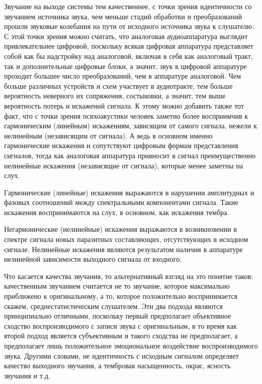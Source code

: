 \documentclass[oneside, final, 14pt]{extreport}
\begin{document}
Звучание на выходе системы тем качественнее, с точки зрения идентичности со звучанием источника звука, чем
меньше стадий обработки и преобразований прошли звуковые колебания на пути от исходного источника звука к слушателю. С этой точки зрения можно считать, что аналоговая аудиоаппаратура выглядит привлекательнее цифровой, поскольку всякая цифровая аппаратура представляет собой как бы надстройку над аналоговой, включая в себя как аналоговый тракт, так и дополнительные цифровые блоки, а значит, звук в цифровой аппаратуре проходит большее число преобразований, чем в аппаратуре аналоговой. Чем больше различных устройств и схем участвует в аудиотракте, тем больше вероятность неверного их сопряжения, состыковки, а значит, тем выше вероятность потерь и искажений сигнала. К этому можно добавить также тот факт, что с точки зрения психоакустики человек заметно более восприимчив к гармоническим (линейным) искажениям, зависящим от самого сигнала, нежели к нелинейным (независящим от сигнала). 
А ведь в основном именно гармонические искажения и сопутствуют цифровым формам представления сигналов, тогда как аналоговая аппаратура привносит в сигнал преимущественно нелинейные искажения (независящие от сигнала), которые менее заметны на слух.

Гармонические (линейные) искажения выражаются в нарушении амплитудных и фазовых соотношений между спектральными компонентами сигнала. Такие искажения воспринимаются на слух, в основном, как искажения тембра.

Негармонические (нелинейные) искажения выражаются в возникновении в спектре сигнала новых паразитных составляющих, отсутствующих в исходном сигнале. Нелинейные искажения являются результатом наличия в аппаратуре нелинейной зависимости выходного сигнала от входного.

Что касается качества звучания, то альтернативный взгляд на это понятие таков: качественным звучанием считается не то звучание, которое максимально приближено к оригинальному, а то, которое положительно воспринимается скажем, среднестатистическим слушателем. Эти два подхода являются принципиально отличными, поскольку первый предполагает объективное сходство воспроизводимого с записи звука с оригинальным, в то время как второй подход является субъективным и такого сходства не предполагает, а предполагает лишь положительное эмоциональное воздействие воспроизводимого звука. Другими словами, не идентичность с исходным сигналом определяет качество выходного
звучания, а тембровая насыщенность, окрас, ясность звучания и т.д.
\end{document}
